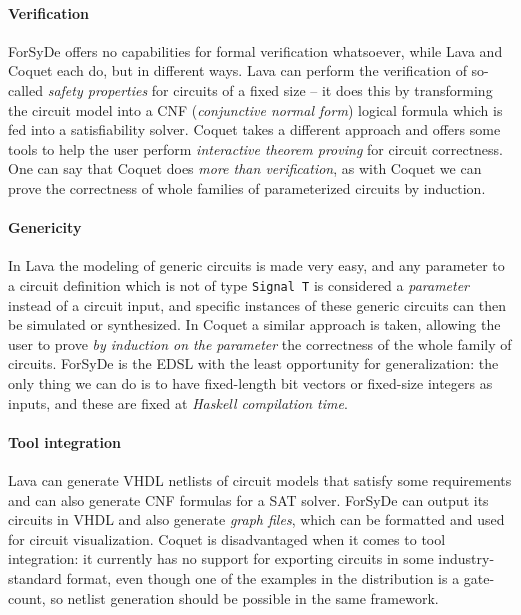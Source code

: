     \paragraph{Verification}
        ForSyDe offers no capabilities for formal verification whatsoever, while Lava and Coquet
        each do, but in different ways. Lava can perform the verification of so-called \emph{safety
        properties} for circuits of a fixed size -- it does this by transforming the circuit model
        into a CNF (\emph{conjunctive normal form}) logical formula which is fed into a
        satisfiability solver. Coquet takes a different approach and offers some tools to help the
        user perform \emph{interactive theorem proving} for circuit correctness. One can say that
        Coquet does \emph{more than verification}, as with Coquet we can prove the correctness of
        whole families of parameterized circuits by induction.

    \paragraph{Genericity}
        In Lava the modeling of generic circuits is made very easy, and any parameter to a circuit
        definition which is not of type \texttt{Signal T} is considered a \emph{parameter} instead
        of a circuit input, and specific instances of these generic circuits can then be simulated
        or synthesized. In Coquet a similar approach is taken, allowing the user to prove \emph{by
        induction on the parameter} the correctness of the whole family of circuits.  ForSyDe is the
        \ac{EDSL} with the least opportunity for generalization: the only thing we can do is to have
        fixed-length bit vectors or fixed-size integers as inputs, and these are fixed at
        \emph{Haskell compilation time}.

    \paragraph{Tool integration}
        Lava can generate VHDL netlists of circuit models that satisfy some requirements and can
        also generate CNF formulas for a SAT solver. ForSyDe can output its circuits in VHDL and
        also generate \emph{graph files}, which can be formatted and used for circuit visualization.
        Coquet is disadvantaged when it comes to tool integration: it currently has no support for
        exporting circuits in some industry-standard format, even though one of the examples in the
        distribution is a gate-count, so netlist generation should be possible in the same
        framework.

